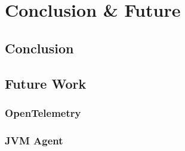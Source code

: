 \documentclass[12pt,pdftex,titlepage]{report}
\begin{document}
    \chapter{Conclusion \& Future}
        \section{Conclusion}

        \section{Future Work}
            \subsection{OpenTelemetry}

            \subsection{JVM Agent}
\end{document}
